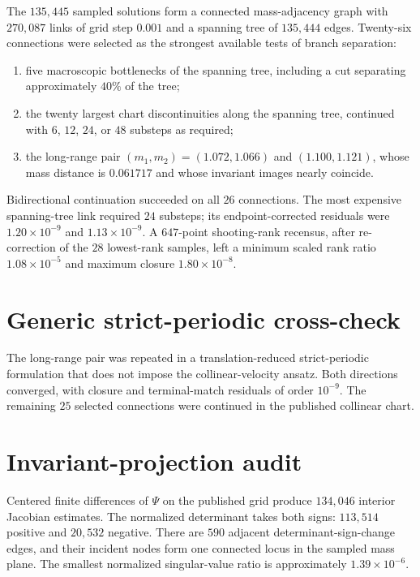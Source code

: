 \documentclass[aps,prl,onecolumn,amsmath,amssymb]{revtex4-2}
\begin{document}
The $135{,}445$ sampled solutions form a connected mass-adjacency graph with
$270{,}087$ links of grid step $0.001$ and a spanning tree of $135{,}444$
edges. Twenty-six connections were selected as the strongest available tests
of branch separation:
\begin{enumerate}
\item five macroscopic bottlenecks of the spanning tree, including a cut
separating approximately $40\%$ of the tree;
\item the twenty largest chart discontinuities along the spanning tree,
continued with $6$, $12$, $24$, or $48$ substeps as required;
\item the long-range pair $(m_1,m_2)=(1.072,1.066)$ and $(1.100,1.121)$, whose
mass distance is $0.061717$ and whose invariant images nearly coincide.
\end{enumerate}
Bidirectional continuation succeeded on all $26$ connections. The most
expensive spanning-tree link required $24$ substeps; its endpoint-corrected
residuals were $1.20\times10^{-9}$ and $1.13\times10^{-9}$. A $647$-point
shooting-rank recensus, after re-correction of the $28$ lowest-rank samples,
left a minimum scaled rank ratio $1.08\times10^{-5}$ and maximum closure
$1.80\times10^{-8}$.

\section{Generic strict-periodic cross-check}

The long-range pair was repeated in a translation-reduced strict-periodic
formulation that does not impose the collinear-velocity ansatz. Both directions
converged, with closure and terminal-match residuals of order $10^{-9}$. The
remaining $25$ selected connections were continued in the published collinear
chart.

\section{Invariant-projection audit}

Centered finite differences of $\Psi$ on the published grid produce
$134{,}046$ interior Jacobian estimates. The normalized determinant takes both
signs: $113{,}514$ positive and $20{,}532$ negative. There are $590$ adjacent
determinant-sign-change edges, and their incident nodes form one connected
locus in the sampled mass plane. The smallest normalized singular-value ratio
is approximately $1.39\times10^{-6}$.
\end{document}
